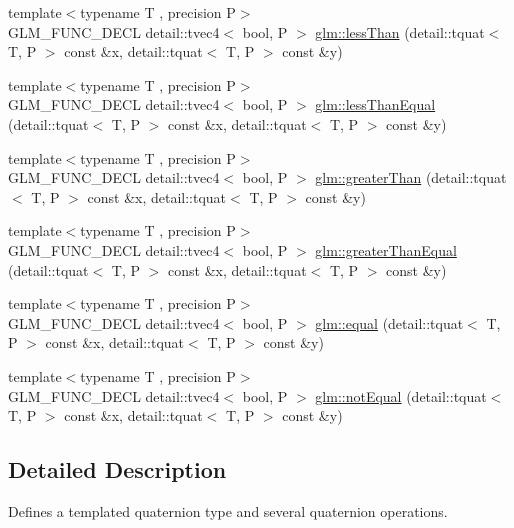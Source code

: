 \begin{DoxyCompactItemize}
\item 
{\footnotesize template$<$typename T , precision P$>$ }\\G\+L\+M\+\_\+\+F\+U\+N\+C\+\_\+\+D\+E\+CL detail\+::tvec4$<$ bool, P $>$ \hyperlink{group__gtc__quaternion_ga4e4c37b86cecde7e1076c5b5fdb920b9}{glm\+::less\+Than} (detail\+::tquat$<$ T, P $>$ const \&x, detail\+::tquat$<$ T, P $>$ const \&y)
\item 
{\footnotesize template$<$typename T , precision P$>$ }\\G\+L\+M\+\_\+\+F\+U\+N\+C\+\_\+\+D\+E\+CL detail\+::tvec4$<$ bool, P $>$ \hyperlink{group__gtc__quaternion_ga313fe20896a8cd43c6d08cc88fa18faa}{glm\+::less\+Than\+Equal} (detail\+::tquat$<$ T, P $>$ const \&x, detail\+::tquat$<$ T, P $>$ const \&y)
\item 
{\footnotesize template$<$typename T , precision P$>$ }\\G\+L\+M\+\_\+\+F\+U\+N\+C\+\_\+\+D\+E\+CL detail\+::tvec4$<$ bool, P $>$ \hyperlink{group__gtc__quaternion_ga63be67bccef0b0ad4e60656223ab3761}{glm\+::greater\+Than} (detail\+::tquat$<$ T, P $>$ const \&x, detail\+::tquat$<$ T, P $>$ const \&y)
\item 
{\footnotesize template$<$typename T , precision P$>$ }\\G\+L\+M\+\_\+\+F\+U\+N\+C\+\_\+\+D\+E\+CL detail\+::tvec4$<$ bool, P $>$ \hyperlink{group__gtc__quaternion_gac90d5af34a03cd665a349ac30e4cc44c}{glm\+::greater\+Than\+Equal} (detail\+::tquat$<$ T, P $>$ const \&x, detail\+::tquat$<$ T, P $>$ const \&y)
\item 
{\footnotesize template$<$typename T , precision P$>$ }\\G\+L\+M\+\_\+\+F\+U\+N\+C\+\_\+\+D\+E\+CL detail\+::tvec4$<$ bool, P $>$ \hyperlink{group__gtc__quaternion_ga32ff2cc6fb576639a6237d8d8ed5818b}{glm\+::equal} (detail\+::tquat$<$ T, P $>$ const \&x, detail\+::tquat$<$ T, P $>$ const \&y)
\item 
{\footnotesize template$<$typename T , precision P$>$ }\\G\+L\+M\+\_\+\+F\+U\+N\+C\+\_\+\+D\+E\+CL detail\+::tvec4$<$ bool, P $>$ \hyperlink{group__gtc__quaternion_gaa3a8cf1aa580e435ca96acafbd7870a5}{glm\+::not\+Equal} (detail\+::tquat$<$ T, P $>$ const \&x, detail\+::tquat$<$ T, P $>$ const \&y)
\end{DoxyCompactItemize}


\subsection{Detailed Description}
Defines a templated quaternion type and several quaternion operations. 

